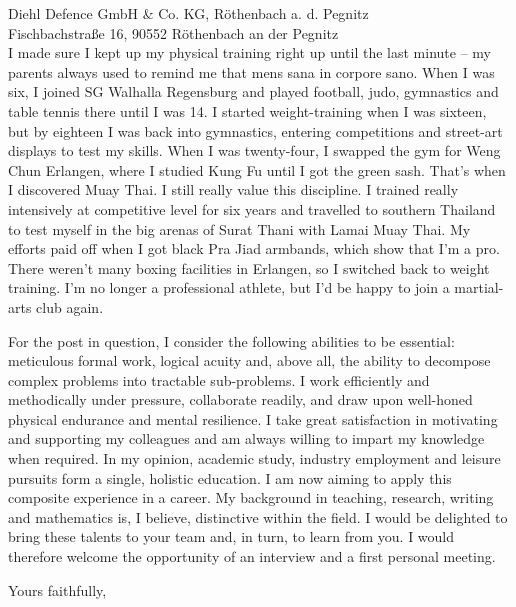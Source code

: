 \documentclass[11pt]{letter}
\begin{document}
\begin{letter}{%
Diehl Defence GmbH & Co. KG, Röthenbach a. d. Pegnitz\\%
Fischbachstraße 16, 90552 Röthenbach an der Pegnitz\\%
}
I made sure I kept up my physical training right up until the last minute – my parents always used to remind me that mens sana in corpore sano. When I was six, I joined SG Walhalla Regensburg and played football, judo, gymnastics and table tennis there until I was 14. I started weight-training when I was sixteen, but by eighteen I was back into gymnastics, entering competitions and street-art displays to test my skills. When I was twenty-four, I swapped the gym for Weng Chun Erlangen, where I studied Kung Fu until I got the green sash. That's when I discovered Muay Thai. I still really value this discipline. I trained really intensively at competitive level for six years and travelled to southern Thailand to test myself in the big arenas of Surat Thani with Lamai Muay Thai. My efforts paid off when I got black Pra Jiad armbands, which show that I'm a pro. There weren't many boxing facilities in Erlangen, so I switched back to weight training. I'm no longer a professional athlete, but I'd be happy to join a martial-arts club again.

For the post in question, I consider the following abilities to be essential: meticulous formal work, logical acuity and, above all, the ability to decompose complex problems into tractable sub-problems. I work efficiently and methodically under pressure, collaborate readily, and draw upon well-honed physical endurance and mental resilience. I take great satisfaction in motivating and supporting my colleagues and am always willing to impart my knowledge when required. In my opinion, academic study, industry employment and leisure pursuits form a single, holistic education. I am now aiming to apply this composite experience in a career. My background in teaching, research, writing and mathematics is, I believe, distinctive within the field. I would be delighted to bring these talents to your team and, in turn, to learn from you. I would therefore welcome the opportunity of an interview and a first personal meeting.

\closing{Yours faithfully,}

\end{letter}
\end{document}
